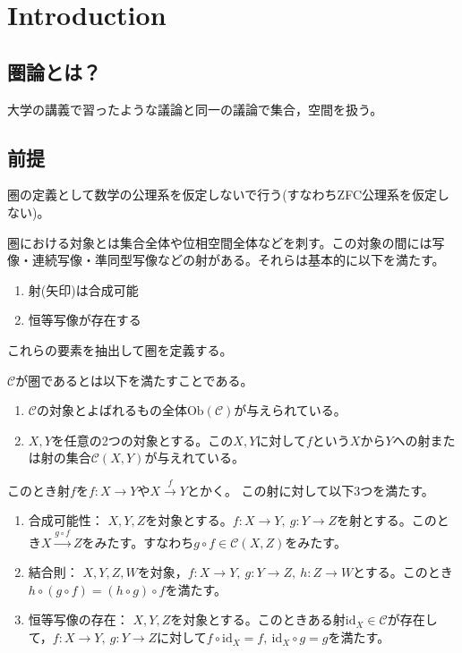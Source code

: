 \documentclass[dvipdfmx]{jsreport}
\newcommand{\category}[1]{\mathcal{#1}}
\newcommand{\object}[1]{\mathrm{Ob}{(\category{#1})}}
\newcommand{\id}[1]{\mathrm{id}_{#1}}
\begin{document}
\section{Introduction}
\subsection{圏論とは？}
    大学の講義で習ったような議論と同一の議論で集合，空間を扱う。

\subsection{前提}
    圏の定義として数学の公理系を仮定しないで行う(すなわちZFC公理系を仮定しない)。

    圏における対象とは集合全体や位相空間全体などを刺す。この対象の間には写像・連続写像・準同型写像などの射がある。それらは基本的に以下を満たす。

\begin{enumerate}
    \item 射(矢印)は合成可能
    \item 恒等写像が存在する
\end{enumerate}
    これらの要素を抽出して圏を定義する。

    $\category{C}$が圏であるとは以下を満たすことである。
\begin{enumerate}
    \item $\category{C}$の対象とよばれるもの全体$\object{C}$が与えられている。
    \item $X, Y$を任意の2つの対象とする。この$X, Y$に対して$f$という$X$から$Y$への射または射の集合$\category{C}(X, Y)$が与えれている。
\end{enumerate}
    このとき射$f$を$f\colon X\to Y$や$X\xrightarrow{f} Y$とかく。
    この射に対して以下3つを満たす。
\begin{enumerate}
    \item 合成可能性：
    $X, Y, Z$を対象とする。$f\colon X\to Y,\ g\colon Y\to Z$を射とする。このとき$X\xrightarrow{g\circ f} Z$をみたす。すなわち$g\circ f\in \category{C}(X, Z)$をみたす。

    \item 結合則：
    $X, Y, Z, W$を対象，$f\colon X\to Y,\ g\colon Y\to Z,\ h\colon Z\to W$とする。このとき$h\circ (g\circ f)= (h\circ g)\circ f$を満たす。

    \item 恒等写像の存在：
    $X, Y, Z$を対象とする。このときある射$\id{X}\in \category{C}$が存在して，$f\colon X\to Y,\ g\colon Y\to Z$に対して$f\circ \id{X}= f,\ \id{X}\circ g= g$を満たす。
\end{enumerate}
\end{document}
